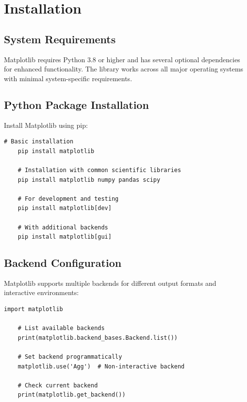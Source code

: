 \clearpage

\section{Installation}
\label{sec:matplotlib_installation}

\subsection{System Requirements}
\label{subsec:matplotlib_system_requirements}

Matplotlib requires Python 3.8 or higher and has several optional dependencies for enhanced functionality. The library works across all major operating systems with minimal system-specific requirements.

\subsection{Python Package Installation}
\label{subsec:matplotlib_python_install}

Install Matplotlib using pip:

\begin{lstlisting}[style=bashstyle, caption={Matplotlib Installation}]
	# Basic installation
	pip install matplotlib
	
	# Installation with common scientific libraries
	pip install matplotlib numpy pandas scipy
	
	# For development and testing
	pip install matplotlib[dev]
	
	# With additional backends
	pip install matplotlib[gui]
\end{lstlisting}

\subsection{Backend Configuration}
\label{subsec:backend_config}

Matplotlib supports multiple backends for different output formats and interactive environments:

\begin{lstlisting}[language=MyPython, caption={Backend Configuration}, label={lst:backend_config}]
	import matplotlib
	
	# List available backends
	print(matplotlib.backend_bases.Backend.list())
	
	# Set backend programmatically
	matplotlib.use('Agg')  # Non-interactive backend
	
	# Check current backend
	print(matplotlib.get_backend())
\end{lstlisting}

